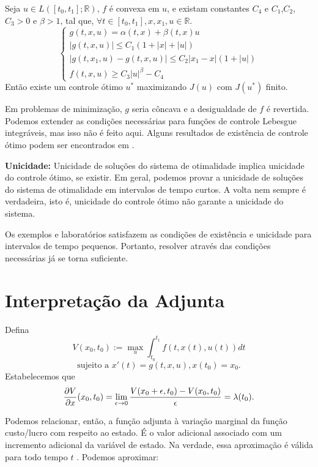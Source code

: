 \begin{theorem}
    Seja $u \in L([t_0,t_1];\mathbb{R})$, $f$ é convexa em $u$, e existam
    constantes $C_4$ e $C_1$,$C_2$,$C_3 >0$ e $\beta > 1$, tal que, $\forall t
    \in [t_0, t_1], x, x_1, u \in \mathbb{R}$. 
    \begin{equation*}
        \begin{cases}
            g(t,x,u) = \alpha (t,x) + \beta (t,x)u \\
            |g(t,x,u)| \leq C_1(1 + |x| + |u|) \\
            |g(t,x_1,u) - g(t,x,u)| \leq C_2|x_1 - x|(1 + |u|) \\
            f(t,x,u) \geq C_3|u|^{\beta} - C_4
        \end{cases}
    \end{equation*}
    Então existe um controle ótimo $u^*$ maximizando $J(u)$ com $J(u^*)$
    finito. 
\end{theorem}

Em problemas de minimização, $g$ seria côncava e a desigualdade de $f$ é
revertida. Podemos extender as condições necessárias para funções de controle
Lebesgue integráveis, mas isso não é feito aqui. Alguns resultados de
existência de controle ótimo podem ser encontrados em \cite{filippov1962}. 

\Space

\textbf{Unicidade:} Unicidade de soluções do sistema de otimalidade implica unicidade
do controle ótimo, se existir. Em geral, podemos provar a unicidade de
soluções do sistema de otimalidade em intervalos de tempo curtos. A volta nem
sempre é verdadeira, isto é, unicidade do controle ótimo não garante a
unicidade do sistema. 

Os exemplos e laboratórios satisfazem as condições de existência e unicidade
para intervalos de tempo pequenos. Portanto, resolver através das condições
necessárias já se torna suficiente. 

\section{Interpretação da Adjunta}

Defina 
$$
V(x_0, t_0) := \max_u \int_{t_0}^{t_1} f(t,x(t), u(t)) dt
$$
$$
\text{sujeito a } x'(t) = g(t,x,u), x(t_0) = x_0.
$$
Estabelecemos que 
$$\frac{\partial V}{\partial x}(x_0, t_0) = \lim_{\epsilon \to 0} \frac{V(x_0 + \epsilon,
t_0) - V(x_0,t_0)}{\epsilon} = \lambda(t_0).$$

Podemos relacionar, então, a função adjunta à variação marginal da função
custo/lucro com respeito ao estado. É o valor adicional associado com um 
incremento adicional da variável de estado. Na verdade, essa aproximação é
válida para todo tempo $t$ \cite[136-139]{kamien2012dynamic}. Podemos aproximar: 

